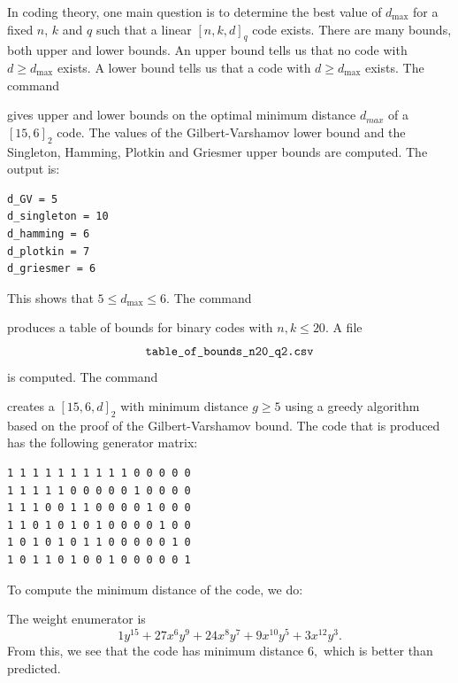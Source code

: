 In coding theory, one main question is 
to determine the best value of $d_{\max}$ for a fixed $n$, $k$ and $q$ such that 
a linear $[n,k,d]_q$ code exists.
There are many bounds, both upper and lower bounds. An upper bound tells us that no code with $d \ge d_{\max}$ exists.
A lower bound tells us that a code with $d \ge d_{\max}$ exists. 
The command  
{\tt

}
gives upper and lower bounds on the optimal minimum distance $d_{max}$ of a $[15,6]_2$ code.
The values of the Gilbert-Varshamov lower bound and the Singleton, Hamming, Plotkin and Griesmer upper bounds are computed. 
The output is:
\begin{verbatim}
d_GV = 5
d_singleton = 10
d_hamming = 6
d_plotkin = 7
d_griesmer = 6
\end{verbatim}
This shows that $5 \le d_{\max} \le 6.$
The command 
{\tt

}
produces a table of bounds for binary codes with $n,k \le 20.$
A file 
$$
\verb'table_of_bounds_n20_q2.csv'
$$ 
is computed.
The command 
{\tt

}
creates a $[15,6,d]_2$ with minimum distance $g \ge 5$ 
using a greedy algorithm based on the proof of the Gilbert-Varshamov bound.
The code that is produced has the following generator matrix:
\begin{verbatim}
1 1 1 1 1 1 1 1 1 1 0 0 0 0 0 
1 1 1 1 1 0 0 0 0 0 1 0 0 0 0 
1 1 1 0 0 1 1 0 0 0 0 1 0 0 0 
1 1 0 1 0 1 0 1 0 0 0 0 1 0 0 
1 0 1 0 1 0 1 1 0 0 0 0 0 1 0 
1 0 1 1 0 1 0 0 1 0 0 0 0 0 1 
\end{verbatim}
To compute the  minimum distance of the code, we do:
{\tt

}
{\tt

}
The weight enumerator is
$$
1y^{15} + 27x^6y^9 + 24x^8y^7 + 9x^{10}y^5 + 3x^{12}y^3.
$$
From this, we see that the code has minimum distance $6,$ 
which is better than predicted.


